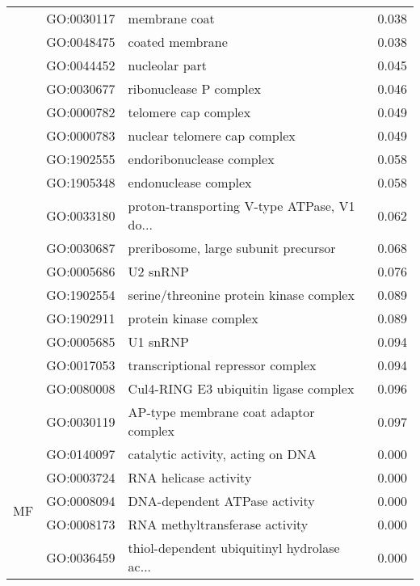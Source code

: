 \begin{longtable}{lllr}
   & GO:0030117 &                                membrane coat &         0.038 \\
   & GO:0048475 &                              coated membrane &         0.038 \\
   & GO:0044452 &                               nucleolar part &         0.045 \\
   & GO:0030677 &                       ribonuclease P complex &         0.046 \\
   & GO:0000782 &                         telomere cap complex &         0.049 \\
   & GO:0000783 &                 nuclear telomere cap complex &         0.049 \\
   & GO:1902555 &                     endoribonuclease complex &         0.058 \\
   & GO:1905348 &                         endonuclease complex &         0.058 \\
   & GO:0033180 &  proton-transporting V-type ATPase, V1 do... &         0.062 \\
   & GO:0030687 &         preribosome, large subunit precursor &         0.068 \\
   & GO:0005686 &                                     U2 snRNP &         0.076 \\
   & GO:1902554 &      serine/threonine protein kinase complex &         0.089 \\
   & GO:1902911 &                       protein kinase complex &         0.089 \\
   & GO:0005685 &                                     U1 snRNP &         0.094 \\
   & GO:0017053 &            transcriptional repressor complex &         0.094 \\
   & GO:0080008 &        Cul4-RING E3 ubiquitin ligase complex &         0.096 \\
   & GO:0030119 &        AP-type membrane coat adaptor complex &         0.097 \\
\cline{1-4}
\multirow{82}{*}{MF} & GO:0140097 &            catalytic activity, acting on DNA &         0.000 \\
   & GO:0003724 &                        RNA helicase activity &         0.000 \\
   & GO:0008094 &                DNA-dependent ATPase activity &         0.000 \\
   & GO:0008173 &               RNA methyltransferase activity &         0.000 \\
   & GO:0036459 &  thiol-dependent ubiquitinyl hydrolase ac... &         0.000 \\

\end{longtable}
